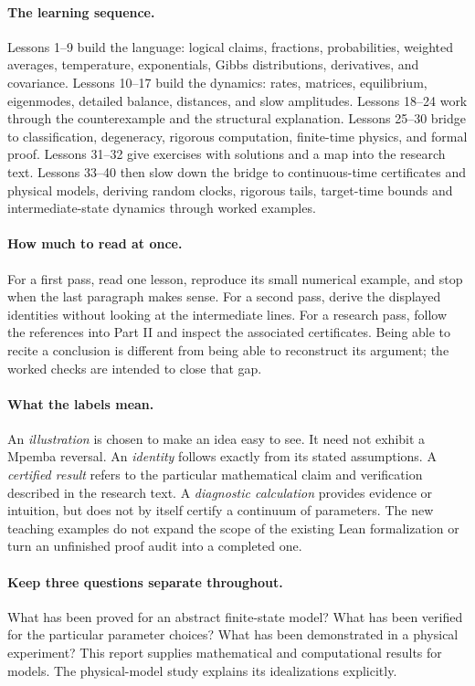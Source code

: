 \documentclass[11pt]{article}
\begin{document}
\paragraph{The learning sequence.}
Lessons 1--9 build the language: logical claims, fractions, probabilities,
weighted averages, temperature, exponentials, Gibbs distributions, derivatives,
and covariance. Lessons 10--17 build the dynamics: rates, matrices,
equilibrium, eigenmodes, detailed balance, distances, and slow amplitudes.
Lessons 18--24 work through the counterexample and the structural explanation.
Lessons 25--30 bridge to classification, degeneracy, rigorous computation,
finite-time physics, and formal proof. Lessons 31--32 give exercises with
solutions and a map into the research text. Lessons 33--40 then slow down
the bridge to continuous-time certificates and physical models, deriving
random clocks, rigorous tails, target-time bounds and intermediate-state
dynamics through worked examples.

\paragraph{How much to read at once.}
For a first pass, read one lesson, reproduce its small numerical example, and
stop when the last paragraph makes sense. For a second pass, derive the displayed
identities without looking at the intermediate lines. For a research pass,
follow the references into Part II and inspect the associated certificates.
Being able to recite a conclusion is different from being able to reconstruct
its argument; the worked checks are intended to close that gap.

\paragraph{What the labels mean.}
An \emph{illustration} is chosen to make an idea easy to see. It need not exhibit
a Mpemba reversal. An \emph{identity} follows exactly from its stated assumptions.
A \emph{certified result} refers to the particular mathematical claim and
verification described in the research text. A \emph{diagnostic calculation}
provides evidence or intuition, but does not by itself certify a continuum of
parameters. The new teaching examples do not expand the scope of the existing
Lean formalization or turn an unfinished proof audit into a completed one.

\paragraph{Keep three questions separate throughout.}
What has been proved for an abstract finite-state model? What has been verified
for the particular parameter choices? What has been demonstrated in a physical
experiment? This report supplies mathematical and computational results for
models. The physical-model study explains its idealizations explicitly.
\end{document}
